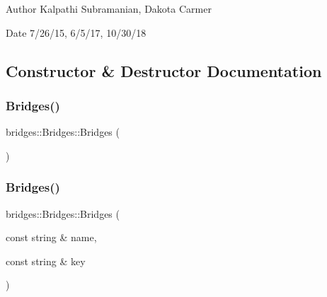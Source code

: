 \begin{DoxyAuthor}{Author}
Kalpathi Subramanian, Dakota Carmer 
\end{DoxyAuthor}
\begin{DoxyDate}{Date}
7/26/15, 6/5/17, 10/30/18 
\end{DoxyDate}


\subsection{Constructor \& Destructor Documentation}
\mbox{\label{classbridges_1_1_bridges_aab8b250b2b5ba0034ceb2494fe5ea437}} 
\subsubsection{\texorpdfstring{Bridges()}{Bridges()}\hspace{0.1cm}{\footnotesize\ttfamily [1/3]}}
{\footnotesize\ttfamily bridges\+::\+Bridges\+::\+Bridges (\begin{DoxyParamCaption}{ }\end{DoxyParamCaption})\hspace{0.3cm}{\ttfamily [inline]}}

\mbox{\label{classbridges_1_1_bridges_a21d9e98cb1f3994300079b489f14e71e}} 
\subsubsection{\texorpdfstring{Bridges()}{Bridges()}\hspace{0.1cm}{\footnotesize\ttfamily [2/3]}}
{\footnotesize\ttfamily bridges\+::\+Bridges\+::\+Bridges (\begin{DoxyParamCaption}\item[{const string \&}]{name,  }\item[{const string \&}]{key }\end{DoxyParamCaption})\hspace{0.3cm}{\ttfamily [inline]}}

\mbox{\label{classbridges_1_1_bridges_a84162a660dec9f7bc11e1f01cada4179}} 
